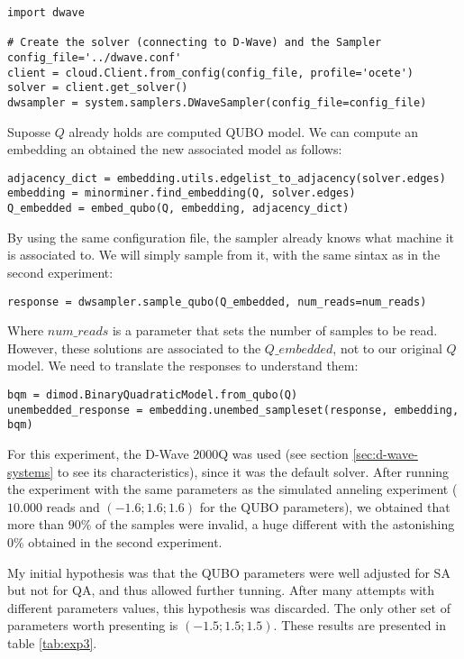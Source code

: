 \begin{verbatim}
import dwave

# Create the solver (connecting to D-Wave) and the Sampler
config_file='../dwave.conf'
client = cloud.Client.from_config(config_file, profile='ocete')
solver = client.get_solver()
dwsampler = system.samplers.DWaveSampler(config_file=config_file)
\end{verbatim}

Suposse $Q$ already holds are computed QUBO model. We can compute an embedding an obtained the new associated model as follows:

\begin{verbatim}
adjacency_dict = embedding.utils.edgelist_to_adjacency(solver.edges)
embedding = minorminer.find_embedding(Q, solver.edges)
Q_embedded = embed_qubo(Q, embedding, adjacency_dict)
\end{verbatim}

By using the same configuration file, the sampler already knows what machine it is associated to. We will simply sample from it, with the same sintax as in the second experiment:

\begin{verbatim}
response = dwsampler.sample_qubo(Q_embedded, num_reads=num_reads)
\end{verbatim}

Where $num\_reads$ is a parameter that sets the number of samples to be read. However, these solutions are associated to the $Q\_embedded$, not to our original $Q$ model. We need to translate the responses to understand them:

\begin{verbatim}
bqm = dimod.BinaryQuadraticModel.from_qubo(Q)
unembedded_response = embedding.unembed_sampleset(response, embedding, bqm)
\end{verbatim}

For this experiment, the D-Wave 2000Q was used (see section \ref{sec:d-wave-systems} to see its characteristics), since it was the default solver. After running the experiment with the same parameters as the simulated anneling experiment ($10.000$ reads and $(-1.6; 1.6; 1.6)$ for the QUBO parameters), we obtained that more than $90\%$ of the samples were invalid, a huge different with the astonishing $0\%$ obtained in the second experiment.

My initial hypothesis was that the QUBO parameters were well adjusted for SA but not for QA, and thus allowed further tunning. After many attempts with different parameters values, this hypothesis was discarded. The only other set of parameters worth presenting is $(-1.5; 1.5; 1.5)$. These results are presented in table \ref{tab:exp3}.

